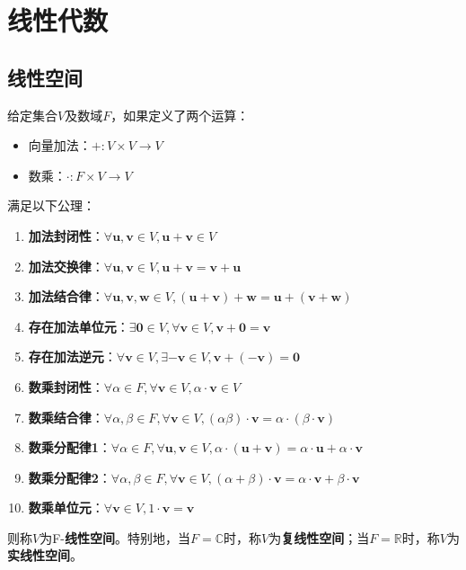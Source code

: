 \section{线性代数}\label{sec:Linear_Algebra}

\subsection{线性空间}\label{sub:linear_space}

\begin{definition}[线性空间]
    给定集合$V$及数域$F$，如果定义了两个运算：
    \begin{itemize}
        \item 向量加法：$+:V\times V\rightarrow V$
        \item 数乘：$\cdot :F\times V\rightarrow V$
    \end{itemize}
    满足以下公理：
    \begin{enumerate}
        \item \textbf{加法封闭性}：$\forall \mathbf{u},\mathbf{v}\in V,\mathbf{u}+\mathbf{v}\in V$
        \item \textbf{加法交换律}：$\forall \mathbf{u},\mathbf{v}\in V,\mathbf{u}+\mathbf{v}=\mathbf{v}+\mathbf{u}$
        \item \textbf{加法结合律}：$\forall \mathbf{u},\mathbf{v},\mathbf{w}\in V,(\mathbf{u}+\mathbf{v})+\mathbf{w}=\mathbf{u}+(\mathbf{v}+\mathbf{w})$
        \item \textbf{存在加法单位元}：$\exists \mathbf{0}\in V,\forall \mathbf{v}\in V,\mathbf{v}+\mathbf{0}=\mathbf{v}$
        \item \textbf{存在加法逆元}：$\forall \mathbf{v}\in V,\exists -\mathbf{v}\in V,\mathbf{v}+(-\mathbf{v})=\mathbf{0}$
        \item \textbf{数乘封闭性}：$\forall \alpha\in F,\forall \mathbf{v}\in V,\alpha\cdot\mathbf{v}\in V$
        \item \textbf{数乘结合律}：$\forall \alpha,\beta\in F,\forall \mathbf{v}\in V,(\alpha\beta)\cdot\mathbf{v}=\alpha\cdot(\beta\cdot\mathbf{v})$
        \item \textbf{数乘分配律1}：$\forall \alpha\in F,\forall \mathbf{u},\mathbf{v}\in V,\alpha\cdot(\mathbf{u}+\mathbf{v})=\alpha\cdot\mathbf{u}+\alpha\cdot\mathbf{v}$
        \item \textbf{数乘分配律2}：$\forall \alpha,\beta\in F,\forall \mathbf{v}\in V,(\alpha+\beta)\cdot\mathbf{v}=\alpha\cdot\mathbf{v}+\beta\cdot\mathbf{v}$
        \item \textbf{数乘单位元}：$\forall \mathbf{v}\in V,1\cdot\mathbf{v}=\mathbf{v}$
    \end{enumerate}
    则称$V$为F-\textbf{线性空间}。特别地，当$F=\mathbb{C}$时，称$V$为\textbf{复线性空间}；当$F=\mathbb{R}$时，称$V$为\textbf{实线性空间}。
\end{definition}

